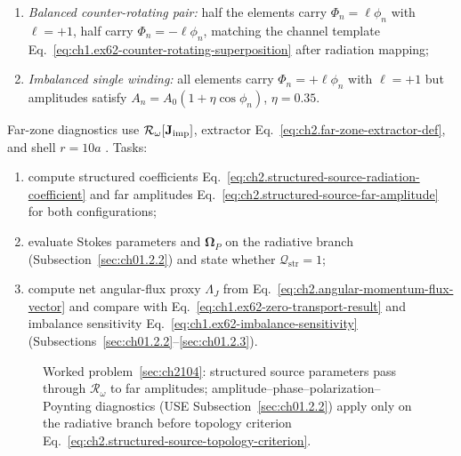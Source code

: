 \begin{enumerate}
\item[(a)] \emph{Balanced counter-rotating pair:} half the elements carry
\(\Phi_n=\ell\phi_n\) with \(\ell=+1\), half carry \(\Phi_n=-\ell\phi_n\), matching the
channel template Eq.~\eqref{eq:ch1.ex62-counter-rotating-superposition} after radiation mapping;
\item[(b)] \emph{Imbalanced single winding:} all elements carry \(\Phi_n=+\ell\phi_n\) with
\(\ell=+1\) but amplitudes satisfy \(A_n=A_0(1+\eta\cos\phi_n)\), \(\eta=0.35\).
\end{enumerate}
Far-zone diagnostics use \(\mathcal{R}_\omega[\mathbf{J}_{\mathrm{imp}}]\), extractor
Eq.~\eqref{eq:ch2.far-zone-extractor-def}, and shell \(r=10a\) . Tasks:
\begin{enumerate}
\item[(i)] compute structured coefficients Eq.~\eqref{eq:ch2.structured-source-radiation-coefficient}
and far amplitudes Eq.~\eqref{eq:ch2.structured-source-far-amplitude} for both configurations;
\item[(ii)] evaluate Stokes parameters and \(\boldsymbol{\Omega}_P\) on the radiative branch
(Subsection~\ref{sec:ch01.2.2}) and state whether \(\mathcal{Q}_{\mathrm{str}}=1\);
\item[(iii)] compute net angular-flux proxy \(\Lambda_J\) from
Eq.~\eqref{eq:ch2.angular-momentum-flux-vector} and compare with
Eq.~\eqref{eq:ch1.ex62-zero-transport-result} and imbalance sensitivity
Eq.~\eqref{eq:ch1.ex62-imbalance-sensitivity} (Subsections~\ref{sec:ch01.2.2}--\ref{sec:ch01.2.3}).
\end{enumerate}
\begin{figure}[t]
\centering
{}
\caption{Worked problem~\ref{sec:ch2104}: structured source parameters pass through
\(\mathcal{R}_\omega\) to far amplitudes; amplitude--phase--polarization--Poynting diagnostics
(USE Subsection~\ref{sec:ch01.2.2}) apply only on the radiative branch before topology criterion
Eq.~\eqref{eq:ch2.structured-source-topology-criterion}.}
\label{fig:ch2.wp-structured-source-radiation}
\end{figure}
